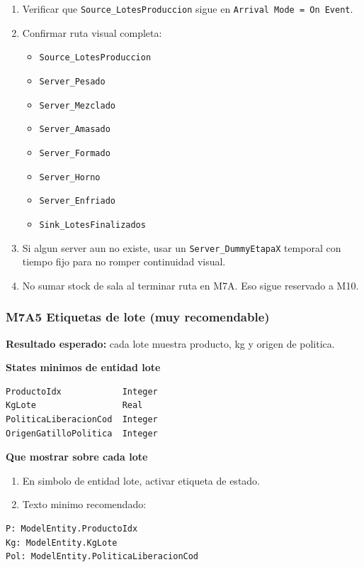 \documentclass[11pt]{article}
\newcommand{\simio}[1]{\texttt{#1}}
\begin{document}
\begin{enumerate}
  \item Verificar que \simio{Source\_LotesProduccion} sigue en \simio{Arrival Mode = On Event}.
  \item Confirmar ruta visual completa:
  \begin{itemize}
    \item \simio{Source\_LotesProduccion}
    \item \simio{Server\_Pesado}
    \item \simio{Server\_Mezclado}
    \item \simio{Server\_Amasado}
    \item \simio{Server\_Formado}
    \item \simio{Server\_Horno}
    \item \simio{Server\_Enfriado}
    \item \simio{Sink\_LotesFinalizados}
  \end{itemize}
  \item Si algun server aun no existe, usar un \simio{Server\_DummyEtapaX} temporal con tiempo fijo para no romper continuidad visual.
  \item No sumar stock de sala al terminar ruta en M7A. Eso sigue reservado a M10.
\end{enumerate}

\subsubsection{M7A5 Etiquetas de lote (muy recomendable)}
\textbf{Resultado esperado:} cada lote muestra producto, kg y origen de politica.

\textbf{States minimos de entidad lote}
\begin{lstlisting}[caption={States obligatorios de ModelEntity para etiquetas M7A}]
ProductoIdx            Integer
KgLote                 Real
PoliticaLiberacionCod  Integer
OrigenGatilloPolitica  Integer
\end{lstlisting}

\textbf{Que mostrar sobre cada lote}
\begin{enumerate}
  \item En simbolo de entidad lote, activar etiqueta de estado.
  \item Texto minimo recomendado:
\end{enumerate}

\begin{lstlisting}[caption={Etiqueta minima recomendada en entidades lote}]
P: ModelEntity.ProductoIdx
Kg: ModelEntity.KgLote
Pol: ModelEntity.PoliticaLiberacionCod
\end{lstlisting}
\end{document}
